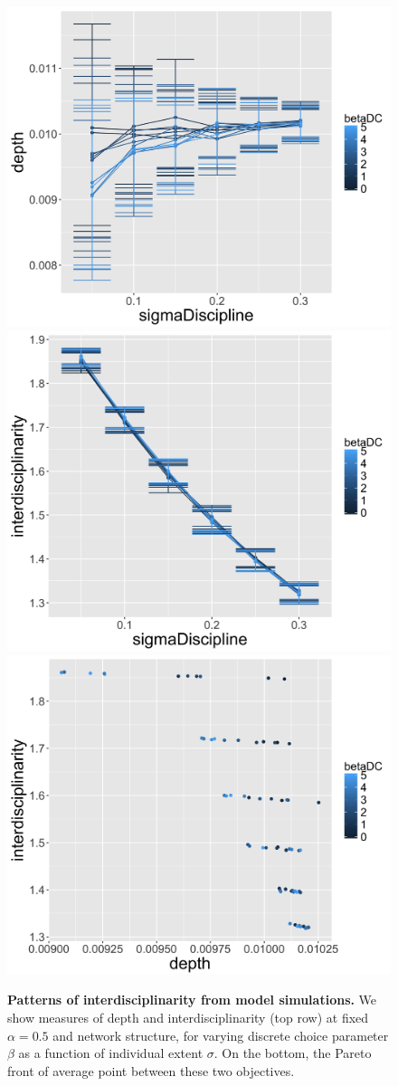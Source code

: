 \documentclass[utf8]{frontiersFPHY} %
\begin{document}
\begin{figure}
	\centering
	\includegraphics[width=0.49\linewidth]{figures/depth-sigma_alpha0-5_rho0}
	\includegraphics[width=0.49\linewidth]{figures/interdisc-sigma_alpha0-5_rho0}\\
	\includegraphics[width=0.8\linewidth]{figures/pareto_alpha0-5_rho0}
	\caption{\textbf{Patterns of interdisciplinarity from model simulations.} We show measures of depth and interdisciplinarity (top row) at fixed $\alpha=0.5$ and network structure, for varying discrete choice parameter $\beta$ as a function of individual extent $\sigma$. On the bottom, the Pareto front of average point between these two objectives.}
	\label{fig:plots}
\end{figure}
\end{document}
